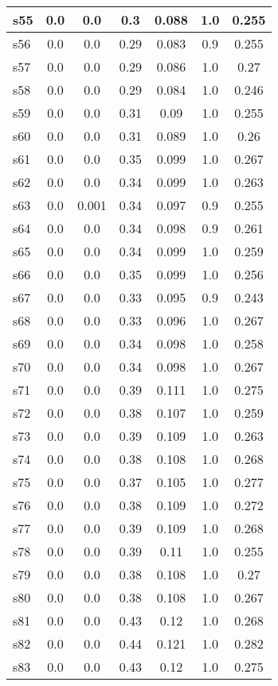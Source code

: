 \documentclass{article}
\begin{document}
\begin{tabular}{|l|c|c|c|c|c|c|}
s55 &0.0 & 0.0 & 0.3 & 0.088 & 1.0 & 0.255\\
\hline
s56 &0.0 & 0.0 & 0.29 & 0.083 & 0.9 & 0.255\\
\hline
s57 &0.0 & 0.0 & 0.29 & 0.086 & 1.0 & 0.27\\
\hline
s58 &0.0 & 0.0 & 0.29 & 0.084 & 1.0 & 0.246\\
\hline
s59 &0.0 & 0.0 & 0.31 & 0.09 & 1.0 & 0.255\\
\hline
s60 &0.0 & 0.0 & 0.31 & 0.089 & 1.0 & 0.26\\
\hline
s61 &0.0 & 0.0 & 0.35 & 0.099 & 1.0 & 0.267\\
\hline
s62 &0.0 & 0.0 & 0.34 & 0.099 & 1.0 & 0.263\\
\hline
s63 &0.0 & 0.001 & 0.34 & 0.097 & 0.9 & 0.255\\
\hline
s64 &0.0 & 0.0 & 0.34 & 0.098 & 0.9 & 0.261\\
\hline
s65 &0.0 & 0.0 & 0.34 & 0.099 & 1.0 & 0.259\\
\hline
s66 &0.0 & 0.0 & 0.35 & 0.099 & 1.0 & 0.256\\
\hline
s67 &0.0 & 0.0 & 0.33 & 0.095 & 0.9 & 0.243\\
\hline
s68 &0.0 & 0.0 & 0.33 & 0.096 & 1.0 & 0.267\\
\hline
s69 &0.0 & 0.0 & 0.34 & 0.098 & 1.0 & 0.258\\
\hline
s70 &0.0 & 0.0 & 0.34 & 0.098 & 1.0 & 0.267\\
\hline
s71 &0.0 & 0.0 & 0.39 & 0.111 & 1.0 & 0.275\\
\hline
s72 &0.0 & 0.0 & 0.38 & 0.107 & 1.0 & 0.259\\
\hline
s73 &0.0 & 0.0 & 0.39 & 0.109 & 1.0 & 0.263\\
\hline
s74 &0.0 & 0.0 & 0.38 & 0.108 & 1.0 & 0.268\\
\hline
s75 &0.0 & 0.0 & 0.37 & 0.105 & 1.0 & 0.277\\
\hline
s76 &0.0 & 0.0 & 0.38 & 0.109 & 1.0 & 0.272\\
\hline
s77 &0.0 & 0.0 & 0.39 & 0.109 & 1.0 & 0.268\\
\hline
s78 &0.0 & 0.0 & 0.39 & 0.11 & 1.0 & 0.255\\
\hline
s79 &0.0 & 0.0 & 0.38 & 0.108 & 1.0 & 0.27\\
\hline
s80 &0.0 & 0.0 & 0.38 & 0.108 & 1.0 & 0.267\\
\hline
s81 &0.0 & 0.0 & 0.43 & 0.12 & 1.0 & 0.268\\
\hline
s82 &0.0 & 0.0 & 0.44 & 0.121 & 1.0 & 0.282\\
\hline
s83 &0.0 & 0.0 & 0.43 & 0.12 & 1.0 & 0.275\\

\end{tabular}
\end{document}

